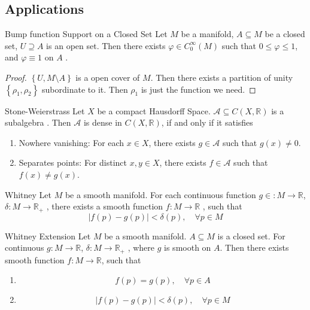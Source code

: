 \documentclass[../main.tex]{subfiles}
\begin{document}
\subsection*{Applications}

\begin{proposition}{Bump function Support on a Closed Set}{}
    Let \(  M  \) be a manifold, \(  A\subseteq M  \) be a closed set, \(  U\supseteq A  \) is an open set. Then there exists \(   \varphi  \in C_{0}^{\infty}\left( M \right)   \) such that \(  0\le  \varphi \le 1  \), and  \(   \varphi \equiv 1  \) on \(  A  \)       .
\end{proposition}

\begin{proof}
    \(  \left\{ U, M\setminus A \right\}  \) is a open cover of \(  M  \). Then there exists a partition  of unity \(  \left\{ \rho _1 ,\rho _2  \right\}  \) subordinate to it.  Then \(  \rho _1   \) is just the function we need. 
\end{proof}


\begin{theorem}{Stone-Weierstrass}{}
    Let \(  X  \) be a compact Hausdorff Space. \(  \mathcal{A}\subseteq C\left( X,\mathbb{R}  \right)   \) is a subalgebra . Then \(  \mathcal{A}  \) is dense in \(  C\left( X,\mathbb{R}  \right)   \), if and only if it satisfies  
    \begin{enumerate}
        \item Nowhere vanishing: For each \(  x \in X  \), there exists \(  g \in \mathcal{A}  \) such that \(  g\left( x \right)\neq 0   \).
        \item Separates points: For distinct \(  x,y \in X  \), there exists \(  f\in \mathcal{A}  \) such that \(  f\left( x \right)\neq g\left( x \right)    \).      
    \end{enumerate}
    
\end{theorem}
\begin{theorem}{Whitney}{}
    Let \(  M  \) be a smooth manifold. For each continuous function \(  g\in :M\to \mathbb{R}   \), \(   \delta :M\to \mathbb{R} _{+ }  \)   , there exists a smooth function \(  f :M\to \mathbb{R}  \) , such that   \[
    \left| f\left( p \right)-g\left( p \right)   \right|<  \delta \left( p \right),\quad \forall p\in M  
    \]
\end{theorem}

\begin{theorem}{Whitney Extension}{}
    Let \(  M  \) be a smooth manifold.  \(  A\subseteq M  \) is a closed set. For continuous \(  g: M\to \mathbb{R}   \), \(   \delta :M\to \mathbb{R} _{+ }  \)  , where \(  g  \) is smooth on \(  A  \). Then there exists smooth function \(  f:M\to \mathbb{R}   \), such that
    \begin{enumerate}
        \item \[
        f\left( p \right)= g\left( p \right),\quad \forall p\in A  
        \]
        \item \[
        \left| f\left( p \right)-g\left( p \right)   \right|<  \delta \left( p \right),\quad \forall p \in M  
        \]
    \end{enumerate}
     
\end{theorem}
\end{document}
